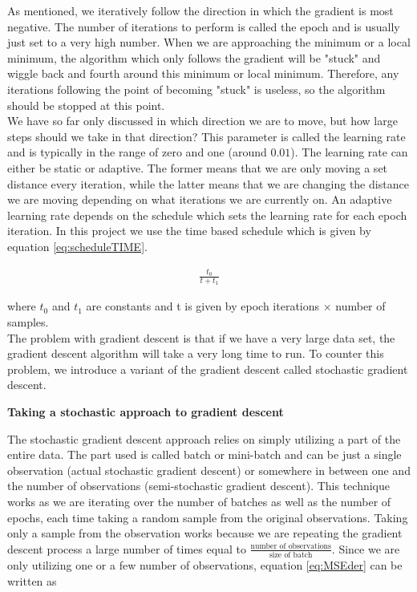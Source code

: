 \documentclass[12pt,a4paper]{article}
\begin{document}
\noindent As mentioned, we iteratively follow the direction in which the gradient is most negative. The number of iterations to perform is called the epoch and is usually just set to a very high number. When we are approaching the minimum or a local minimum, the algorithm which only follows the gradient will be "stuck" and wiggle back and fourth around this minimum or local minimum. Therefore, any iterations following the point of becoming "stuck" is useless, so the algorithm should be stopped at this point.
\\
We have so far only discussed in which direction we are to move, but how large steps should we take in that direction? This parameter is called the learning rate and is typically in the range of zero and one (around $0.01$). The learning rate can either be static or adaptive. The former means that we are only moving a set distance every iteration, while the latter means that we are changing the distance we are moving depending on what iterations we are currently on. An adaptive learning rate depends on the schedule which sets the learning rate for each epoch iteration. In this project we use the time based schedule which is given by equation \ref{eq:scheduleTIME}.

\begin{equation}\label{eq:scheduleTIME}
\begin{aligned}
\frac{t_0}{t + t_1}
\end{aligned}
\end{equation}

\noindent where $t_0$ and $t_1$ are constants and t is given by epoch iterations $\times$ number of samples. 
\\
The problem with gradient descent is that if we have a very large data set, the gradient descent algorithm will take a very long time to run. To counter this problem, we introduce a variant of the gradient descent called stochastic gradient descent.

\begin{center}
\large{\textbf{Taking a stochastic approach to gradient descent}}
\end{center}

\noindent The stochastic gradient descent approach relies on simply utilizing a part of the entire data. The part used is called batch or mini-batch and can be just a single observation (actual stochastic gradient descent) or somewhere in between one and the number of observations (semi-stochastic gradient descent). This technique works as we are iterating over the number of batches as well as the number of epochs, each time taking a random sample from the original observations. Taking only a sample from the observation works because we are repeating the gradient descent process a large number of times equal to $\frac{\textrm{number of observations}}{\textrm{size of batch}}$. Since we are only utilizing one or a few number of observations, equation \ref{eq:MSEder} can be written as
\end{document}
